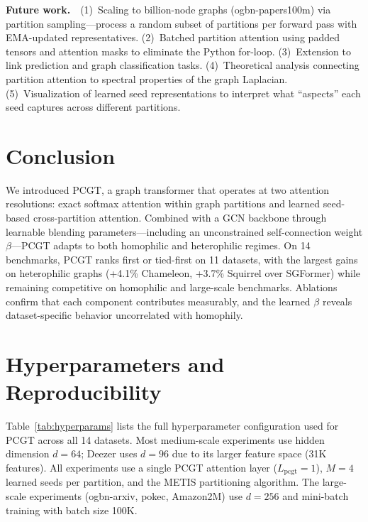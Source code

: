 \documentclass[sigconf]{acmart}
\begin{document}
\textbf{Future work.}~~(1)~Scaling to billion-node graphs (ogbn-papers100m) via partition sampling---process a random subset of partitions per forward pass with EMA-updated representatives. (2)~Batched partition attention using padded tensors and attention masks to eliminate the Python for-loop. (3)~Extension to link prediction and graph classification tasks. (4)~Theoretical analysis connecting partition attention to spectral properties of the graph Laplacian. (5)~Visualization of learned seed representations to interpret what ``aspects'' each seed captures across different partitions.

\section{Conclusion}

We introduced PCGT, a graph transformer that operates at two attention resolutions: exact softmax attention within graph partitions and learned seed-based cross-partition attention. Combined with a GCN backbone through learnable blending parameters---including an unconstrained self-connection weight $\beta$---PCGT adapts to both homophilic and heterophilic regimes. On 14 benchmarks, PCGT ranks first or tied-first on 11 datasets, with the largest gains on heterophilic graphs (+4.1\% Chameleon, +3.7\% Squirrel over SGFormer) while remaining competitive on homophilic and large-scale benchmarks. Ablations confirm that each component contributes measurably, and the learned $\beta$ reveals dataset-specific behavior uncorrelated with homophily.





\appendix

\section{Hyperparameters and Reproducibility}
\label{app:hyperparams}
\label{app:reproducibility}

Table~\ref{tab:hyperparams} lists the full hyperparameter configuration used for PCGT across all 14 datasets. Most medium-scale experiments use hidden dimension $d=64$; Deezer uses $d=96$ due to its larger feature space (31K features). All experiments use a single PCGT attention layer ($L_\text{pcgt}=1$), $M=4$ learned seeds per partition, and the METIS partitioning algorithm. The large-scale experiments (ogbn-arxiv, pokec, Amazon2M) use $d=256$ and mini-batch training with batch size 100K.
\end{document}
